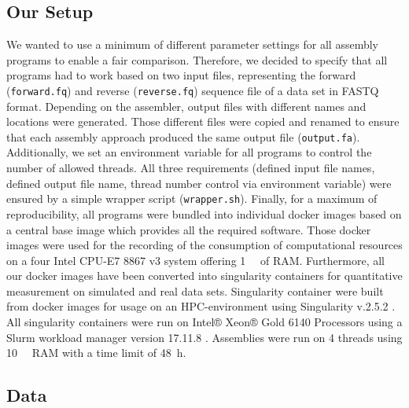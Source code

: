 \documentclass{bmcart}
\begin{document}
\subsection*{Our Setup}
We wanted to use a minimum of different parameter settings for all assembly programs to enable a fair comparison. 
Therefore, we decided to specify that all programs had to work based on two input files, representing the forward (\texttt{forward.fq}) and reverse  (\texttt{reverse.fq}) sequence file of a data set in FASTQ format.
Depending on the assembler, output files with different names and locations were generated.
Those different files were copied and renamed to ensure that each assembly approach produced the same output file (\texttt{output.fa}). 
Additionally, we set an environment variable for all programs to control the number of allowed threads.
All three requirements (defined input file names, defined output file name, thread number control via environment variable) were ensured by a simple wrapper script (\texttt{wrapper.sh}).
Finally, for a maximum of reproducibility, all programs were bundled into individual docker images based on a central base image which provides all the required software. Those docker images were used for the recording of the consumption of computational resources on a four Intel CPU-E7 8867 v3 system offering \SI{1}{\tera\byte} of RAM.
Furthermore, all our docker images have been converted into singularity containers for quantitative measurement on simulated and real data sets.
Singularity container were built from docker images for usage on an HPC-environment using Singularity v.2.5.2 \cite{kurtzer2017singularity}.
All singularity containers were run on %
Intel® Xeon® Gold \num{6140} Processors using a Slurm workload manager version 17.11.8 \cite{Jette02slurm}. Assemblies were run on \num{4} threads using \SI{10}{\gibi\byte} RAM with a time limit of \SI{48}{\hour}.
\subsection*{Data}
\end{document}
